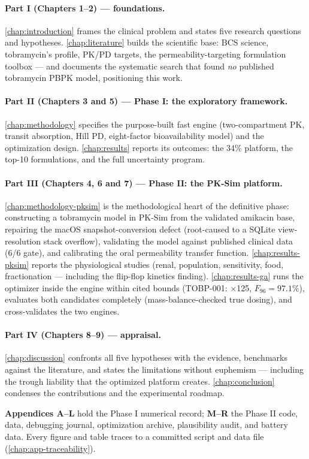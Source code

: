 \paragraph{Part I (Chapters 1--2) --- foundations.}
\cref{chap:introduction} frames the clinical problem and states five research questions and hypotheses. \cref{chap:literature} builds the scientific base: BCS science, tobramycin's profile, PK/PD targets, the permeability-targeting formulation toolbox --- and documents the systematic search that found \emph{no} published tobramycin PBPK model, positioning this work.

\paragraph{Part II (Chapters 3 and 5) --- Phase I: the exploratory framework.}
\cref{chap:methodology} specifies the purpose-built fast engine (two-compartment PK, transit absorption, Hill PD, eight-factor bioavailability model) and the optimization design. \cref{chap:results} reports its outcomes: the 34\% platform, the top-10 formulations, and the full uncertainty program.

\paragraph{Part III (Chapters 4, 6 and 7) --- Phase II: the PK-Sim platform.}
\cref{chap:methodology-pksim} is the methodological heart of the definitive phase: constructing a tobramycin model in PK-Sim from the validated amikacin base, repairing the macOS snapshot-conversion defect (root-caused to a SQLite view-resolution stack overflow), validating the model against published clinical data (6/6 gate), and calibrating the oral permeability transfer function. \cref{chap:results-pksim} reports the physiological studies (renal, population, sensitivity, food, fractionation --- including the flip-flop kinetics finding). \cref{chap:results-ga} runs the optimizer inside the engine within cited bounds (TOBP-001: $\times$125, $F_{96} = 97.1\%$), evaluates both candidates completely (mass-balance-checked true dosing), and cross-validates the two engines.

\paragraph{Part IV (Chapters 8--9) --- appraisal.}
\cref{chap:discussion} confronts all five hypotheses with the evidence, benchmarks against the literature, and states the limitations without euphemism --- including the trough liability that the optimized platform creates. \cref{chap:conclusion} condenses the contributions and the experimental roadmap.

\medskip
\noindent\textbf{Appendices A--L} hold the Phase I numerical record; \textbf{M--R} the Phase II code, data, debugging journal, optimization archive, plausibility audit, and battery data. Every figure and table traces to a committed script and data file (\cref{chap:app-traceability}).
